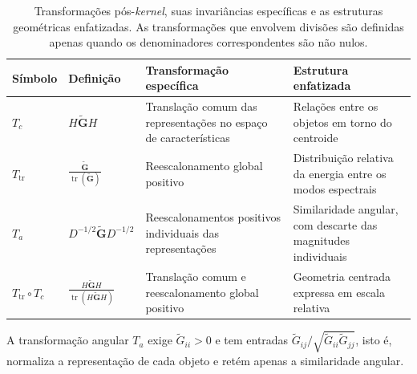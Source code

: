 \begin{table}[pos=ht]
\scriptsize
\centering
\caption{Transformações pós-\textit{kernel}, suas invariâncias específicas e as estruturas geométricas enfatizadas. As transformações que envolvem divisões são definidas apenas quando os denominadores correspondentes são não nulos.}
\label{tab:T_catalog}
\renewcommand{\arraystretch}{1.4}
\begin{tabular}{p{1.5cm} p{2.5cm} p{4.3cm} p{4.6cm}}
\hline
\textbf{Símbolo}
&
\textbf{Definição}
&
\textbf{Transformação específica}
&
\textbf{Estrutura enfatizada}
\\
\hline

$T_c$
&
$H\widetilde{\mathbf{G}}H$
&
Translação comum das representações no espaço de características
&
Relações entre os objetos em torno do centroide
\\

$T_{\mathrm{tr}}$
&
$\displaystyle
\frac{\widetilde{\mathbf{G}}}
{\operatorname{tr}(\widetilde{\mathbf{G}})}$
&
Reescalonamento global positivo
&
Distribuição relativa da energia entre os modos espectrais
\\

$T_a$
&
$\displaystyle
D^{-1/2}
\widetilde{\mathbf{G}}
D^{-1/2}$
&
Reescalonamentos positivos individuais das representações
&
Similaridade angular, com descarte das magnitudes individuais
\\

$T_{\mathrm{tr}}\circ T_c$
&
$\displaystyle
\frac{
    H\widetilde{\mathbf{G}}H
}{
    \operatorname{tr}
    \left(
        H\widetilde{\mathbf{G}}H
    \right)
}$
&
Translação comum e reescalonamento global positivo
&
Geometria centrada expressa em escala relativa
\\

\hline
\end{tabular}
\end{table}

A transformação angular $T_a$ exige $\widetilde{G}_{ii}>0$ e tem entradas $\widetilde{G}_{ij}/\sqrt{\widetilde{G}_{ii}\widetilde{G}_{jj}}$, isto é, normaliza a representação de cada objeto e retém apenas a similaridade angular.

